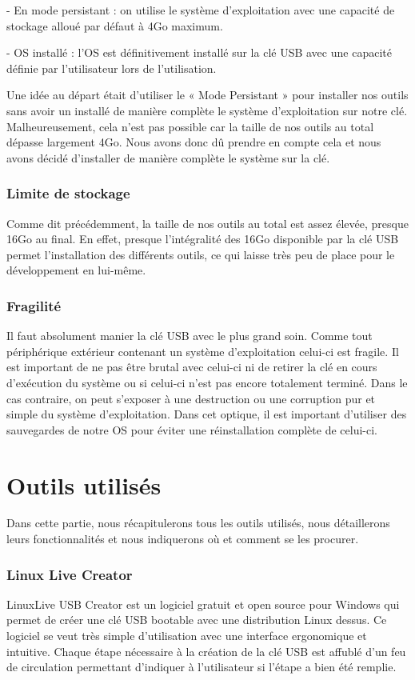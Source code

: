 \documentclass[final]{polytech/polytech}
\begin{document}
- En mode persistant : on utilise le système d’exploitation avec une capacité de stockage alloué par défaut à 4Go maximum.

- OS installé : l’OS est définitivement installé sur la clé USB avec une capacité définie par l’utilisateur lors de l’utilisation.

Une idée au départ était d’utiliser le « Mode Persistant » pour installer nos outils sans avoir un installé de manière complète le système d’exploitation sur notre clé. Malheureusement, cela n’est pas possible car la taille de nos outils au total dépasse largement 4Go. Nous avons donc dû prendre en compte cela et nous avons décidé d’installer de manière complète le système sur la clé.

\section{Limite de stockage}
Comme dit précédemment, la taille de nos outils au total est assez élevée, presque 16Go au final. En effet, presque l’intégralité des 16Go disponible par la clé USB permet l’installation des différents outils, ce qui laisse très peu de place pour le développement en lui-même.

\section{Fragilité}
Il faut absolument manier la clé USB avec le plus grand soin. Comme tout périphérique extérieur contenant un système d’exploitation celui-ci est fragile. Il est important de ne pas être brutal avec celui-ci ni de retirer la clé en cours d’exécution du système ou si celui-ci n’est pas encore totalement terminé. Dans le cas contraire, on peut s’exposer à une destruction ou une corruption pur et simple du système d’exploitation. Dans cet optique, il est important d’utiliser des sauvegardes de notre OS pour éviter une réinstallation complète de celui-ci.

\part{Outils utilisés}
Dans cette partie, nous récapitulerons tous les outils utilisés, nous détaillerons leurs fonctionnalités et nous indiquerons où et comment se les procurer.

\section{Linux Live Creator}
LinuxLive USB Creator est un logiciel gratuit et open source pour Windows qui permet de créer une clé USB bootable avec une distribution Linux dessus. Ce logiciel se veut très simple d’utilisation avec une interface ergonomique et intuitive. Chaque étape nécessaire à la création de la clé USB est affublé d’un feu de circulation permettant d’indiquer à l’utilisateur si l’étape a bien été remplie.
\end{document}
